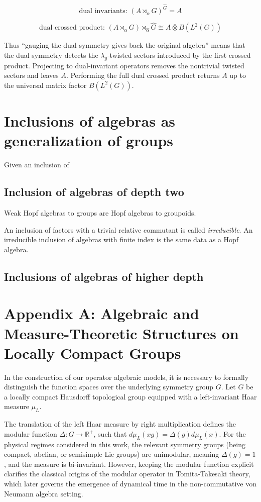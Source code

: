 \documentclass[11pt]{article}
\begin{document}
\[
\boxed{
\text{dual invariants: }
(A\rtimes_\alpha G)^{\widehat G}=A
}
\]

\[
\boxed{
\text{dual crossed product: }
(A\rtimes_\alpha G)\rtimes_{\widehat\alpha}\widehat G
\cong
A\bar\otimes B(L^2(G))
}
\]

Thus ``gauging the dual symmetry gives back the original algebra'' means that the dual symmetry detects the \(\lambda_g\)-twisted sectors introduced by the first crossed product. Projecting to dual-invariant operators removes the nontrivial twisted sectors and leaves \(A\). Performing the full dual crossed product returns \(A\) up to the universal matrix factor \(B(L^2(G))\).

\section{Inclusions of algebras as generalization of groups}

Given an inclusion of 

\subsection{Inclusion of algebras of depth two}

Weak Hopf algebras to groups are Hopf algebras to groupoids.

An inclusion of factors with a trivial relative commutant is called {\it irreducible}. An irreducible inclusion of algebras with finite index is the same data as a Hopf algebra. 

\subsection{Inclusions of algebras of higher depth}

\section*{Appendix A: Algebraic and Measure-Theoretic Structures on Locally Compact Groups}
\label{app:haar_algebras}

In the construction of our operator algebraic models, it is necessary to formally distinguish the function spaces over the underlying symmetry group $G$. Let $G$ be a locally compact Hausdorff topological group equipped with a left-invariant Haar measure $\mu_L$. 

The translation of the left Haar measure by right multiplication defines the modular function $\Delta: G \to \mathbb{R}^+$, such that $d\mu_L(xg) = \Delta(g) d\mu_L(x)$. For the physical regimes considered in this work, the relevant symmetry groups (being compact, abelian, or semisimple Lie groups) are unimodular, meaning $\Delta(g) = 1$, and the measure is bi-invariant. However, keeping the modular function explicit clarifies the classical origins of the modular operator in Tomita-Takesaki theory, which later governs the emergence of dynamical time in the non-commutative von Neumann algebra setting.
\end{document}
